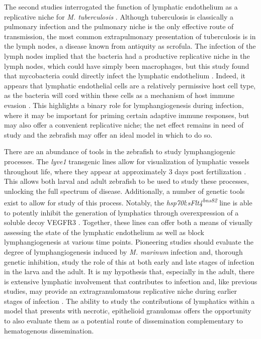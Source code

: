 The second studies interrogated the function of lymphatic endothelium as a replicative niche for \textit{M. tuberculosis} \citep{Lerner2016, Lerner2020}. Although tuberculosis is classically a pulmonary infection and the pulmonary niche is the only effective route of transmission, the most common extrapulmonary presentation of tuberculosis is in the lymph nodes, a disease known from antiquity as scrofula. The infection of the lymph nodes implied that the bacteria had a productive replicative niche in the lymph nodes, which could have simply been macrophages, but this study found that mycobacteria could directly infect the lymphatic endothelium \citep{Lerner2016}. Indeed, it appears that lymphatic endothelial cells are a relatively permissive host cell type, as the bacteria will cord within these cells as a mechanism of host immune evasion \citep{Lerner2020}. This highlights a binary role for lymphangiogenesis during infection, where it may be important for priming certain adaptive immune responses, but may also offer a convenient replicative niche; the net effect remains in need of study and the zebrafish may offer an ideal model in which to do so.

There are an abundance of tools in the zebrafish to study lymphangiogenic processes. The \textit{lyve1} transgenic lines allow for visualization of lymphatic vessels throughout life, where they appear at approximately 3 days post fertilization \citep{Okuda2012}. This allows both larval and adult zebrafish to be used to study these processes, unlocking the full spectrum of disease. Additionally, a number of genetic tools exist to allow for study of this process. Notably, the \textit{hsp70l}:\textit{sFlt4\textsuperscript{bns82}} line is able to potently inhibit the generation of lymphatics through overexpression of a soluble decoy VEGFR3 \citep{Matsuoka2016}. Together, these lines can offer both a means of visually assessing the state of the lymphatic endothelium as well as block lymphangiogenesis at various time points. Pioneering studies should evaluate the degree of lymphangiogenesis induced by \textit{M. marinum} infection and, thorough genetic inhibition, study the role of this at both early and late stages of infection in the larva and the adult. It is my hypothesis that, especially in the adult, there is extensive lymphatic involvement that contributes to infection and, like previous studies, may provide an extragranulomatous replicative niche during earlier stages of infection \citep{Lerner2016}. The ability to study the contributions of lymphatics within a model that presents with necrotic, epithelioid granulomas offers the opportunity to also evaluate them as a potential route of dissemination complementary to hematogenous dissemination. 

